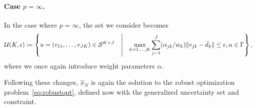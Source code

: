 \documentclass[12pt]{article}
\theoremstyle{thmstyleone}%
\theoremstyle{thmstyletwo}%
\theoremstyle{thmstylethree}%
\newcommand{\reviewChanges}{}
\begin{document}
\reviewChanges{\paragraph{Case $p = \infty$.}
In the case where $p = \infty$, the set we consider becomes
\begin{equation*}
	\label{eq:uncset_inf_max}
	{\mathcal{U}}(K, \epsilon) \coloneqq \left\{ u = (v_{11},\dots,v_{JK}) \in \mathcal{S}^{K\times J} \quad\middle|\quad \max_{k=1,\dots,K} \sum_{j=1}^J (\alpha_{jk}/w_k) \| v_{jk} - \bar{d}_k \| \le \epsilon, \alpha \in \Gamma\right\},
\end{equation*}
where we once again introduce weight parameters $\alpha$. 
}

\reviewChanges{
Following these changes, $\hat{x}_N$ is again the solution to the robust optimization problem~\eqref{eq:robustopt}, defined now with the generalized uncertainty set and constraint.
}
\end{document}
